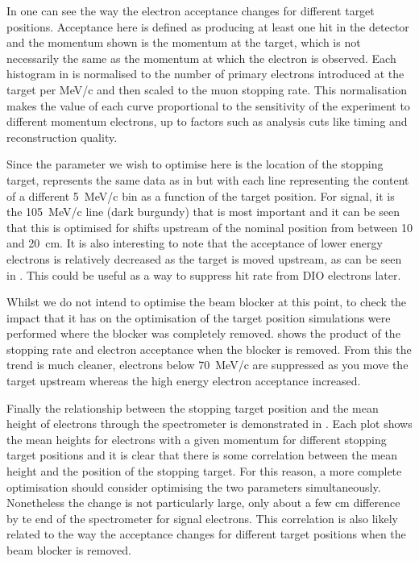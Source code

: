 \FigOptimStopTgtPosSensitivitySpect
In  one can see the way the electron acceptance changes for different target positions.
Acceptance here is defined as producing at least one hit in the detector and the momentum shown is the momentum at the target, which is not necessarily the same as the momentum at which the electron is observed.
Each histogram in  is normalised to the number of primary electrons introduced at the target per MeV/c and then scaled to the muon stopping rate.
This normalisation makes the value of each curve proportional to the sensitivity of the experiment to different momentum electrons, up to factors such as analysis cuts like timing and reconstruction quality.

\FigOptimStopTgtPosSensitivityIntegral
Since the parameter we wish to optimise here is the location of the stopping target,  represents the same data as in  but with each line representing the content of a different 5~MeV/c bin as a function of the target position.
For signal, it is the 105~MeV/c line (dark burgundy) that is most important and it can be seen that this is optimised for shifts upstream of the nominal position from between 10 and 20~cm.
It is also interesting to note that the acceptance of lower energy electrons is relatively decreased as the target is moved upstream, as can be seen in .
This could be useful as a way to suppress hit rate from DIO electrons later.

Whilst we do not intend to optimise the beam blocker at this point, to check the impact that it has on the optimisation of the target position simulations were performed where the blocker was completely removed.
 shows the product of the stopping rate and electron acceptance when the blocker is removed.
From this the trend is much cleaner, electrons below 70~MeV/c are suppressed as you move the target upstream whereas the high energy electron acceptance increased.
\FigOptimStopTgtPosSensitivityNoBeamBlock


\FigOptimStopTgtPosHeights
Finally the relationship between the stopping target position and the mean height of electrons through the spectrometer is demonstrated in .
Each plot shows the mean heights for electrons with a given momentum for different stopping target positions and it is clear that there is some correlation between the mean height and the position of the stopping target.
For this reason, a more complete optimisation should consider optimising the two parameters simultaneously.
Nonetheless the change is not particularly large, only about a few cm difference by te end of the spectrometer for signal electrons.
This correlation is also likely related to the way the acceptance changes for different target positions when the beam blocker is removed.

